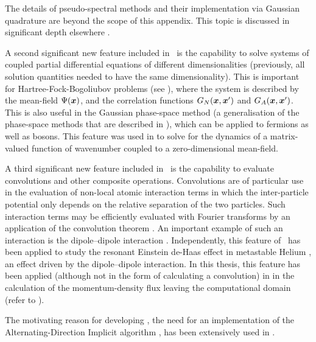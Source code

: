 The details of pseudo-spectral methods and their implementation via Gaussian quadrature are beyond the scope of this appendix.  This topic is discussed in significant depth elsewhere \citep{SpectralMethods}.

A second significant new feature included in \xpdeint\ is the capability to solve systems of coupled partial differential equations of different dimensionalities (previously, all solution quantities needed to have the same dimensionality).  This is important for Hartree-Fock-Bogoliubov problems (see ), where the system is described by the mean-field $\Psi(\bm{x})$, and the correlation functions $G_{N}(\bm{x}, \bm{x}')$ and $G_A(\bm{x}, \bm{x}')$.  This is also useful in the Gaussian phase-space method \citep{Drummond:2007,Drummond:2007a} (a generalisation of the phase-space methods that are described in ),  which can be applied to fermions as well as bosons.  This feature was used in  to solve for the dynamics of a matrix-valued function of wavenumber coupled to a zero-dimensional mean-field.

A third significant new feature included in \xpdeint\ is the capability to evaluate convolutions and other composite operations.  Convolutions are of particular use in the evaluation of non-local atomic interaction terms in which the inter-particle potential only depends on the relative separation of the two particles.  Such interaction terms may be efficiently evaluated with Fourier transforms by an application of the convolution theorem \citep{ArfkenWeber}.  An important example of such an interaction is the dipole--dipole interaction \citep{Goral:2002}.  Independently, this feature of \xpdeint\ has been applied to study the resonant Einstein de-Haas effect \citep{Gawryluk:2007} in metastable Helium \citep{Stevenson:2008}, an effect driven by the dipole--dipole interaction.  In this thesis, this feature has been applied (although not in the form of calculating a convolution) in  in the calculation of the momentum-density flux leaving the computational domain (refer to ).

The motivating reason for developing \xpdeint, the need for an implementation of the Alternating-Direction Implicit algorithm \citep{NumericalRecipes}, has been extensively used in .

